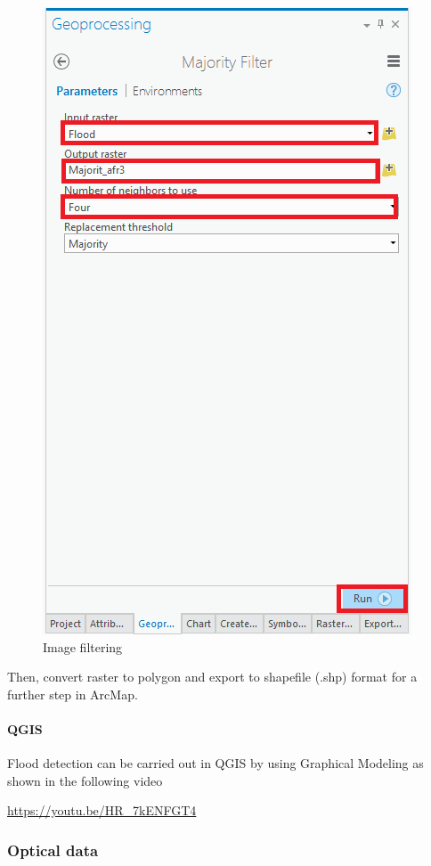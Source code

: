 \documentclass[]{book}
\let\oldparagraph\paragraph
\renewcommand{\paragraph}[1]{\oldparagraph{#1}\mbox{}}
\theoremstyle{definition}
\theoremstyle{definition}
\theoremstyle{definition}
\theoremstyle{remark}
\begin{document}
\begin{figure}

{\centering \includegraphics[width=0.7\linewidth]{img/fig42_workflow6} 

}

\caption{Image filtering}\label{fig:fig42h}
\end{figure}

Then, convert raster to polygon and export to shapefile (.shp) format
for a further step in ArcMap.

\paragraph{QGIS}\label{qgis}

Flood detection can be carried out in QGIS by using Graphical Modeling
as shown in the following video

\url{https://youtu.be/HR_7kENFGT4}

\subsubsection{Optical data}\label{optical-data}
\end{document}
